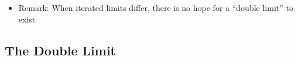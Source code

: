 \documentclass[
  10pt,
  letterpaper,
]{scrbook}
\providecommand{\tightlist}{%
  \setlength{\itemsep}{0pt}\setlength{\parskip}{0pt}}
\begin{document}
\begin{itemize}
  \begin{itemize}
  \tightlist
  \item
    Fix \(m\), let \(n \to \infty\): \((1 - 1/m)^n \to 0\) (since
    \(0 < 1 - 1/m < 1\))
  \item
    Fix \(n\), let \(m \to \infty\): \((1 - 1/m)^n \to 1\)
  \item
    So \(\lim_m \lim_n a_{mn} = 0\) but \(\lim_n \lim_m a_{mn} = 1\)
  \item
    Along the diagonal \(m = n\): \((1 - 1/n)^n \to 1/e\) (Chapter 2)
  \item
    Three different values from three different approaches!
  \end{itemize}
\item
  Remark: When iterated limits differ, there is no hope for a ``double
  limit'' to exist
\end{itemize}

\subsection{The Double Limit}\label{the-double-limit}
\end{document}
